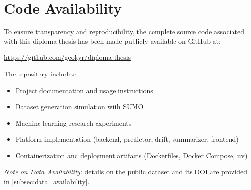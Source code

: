 \appendix

\chapter{Code Availability}
\label{appendix:code}

To ensure transparency and reproducibility, the complete source code associated with this diploma thesis has been made publicly available on GitHub at:

\begin{center}
    \url{https://github.com/geokyr/diploma-thesis}
\end{center}

The repository includes:
\begin{itemize}
    \item Project documentation and usage instructions
    \item Dataset generation simulation with SUMO
    \item Machine learning research experiments
    \item Platform implementation (backend, predictor, drift, summarizer, frontend)
    \item Containerization and deployment artifacts (Dockerfiles, Docker Compose, uv)
\end{itemize}

\bigskip
\noindent\textit{Note on Data Availability:} details on the public dataset and its DOI are provided in \autoref{subsec:data_availability}.
